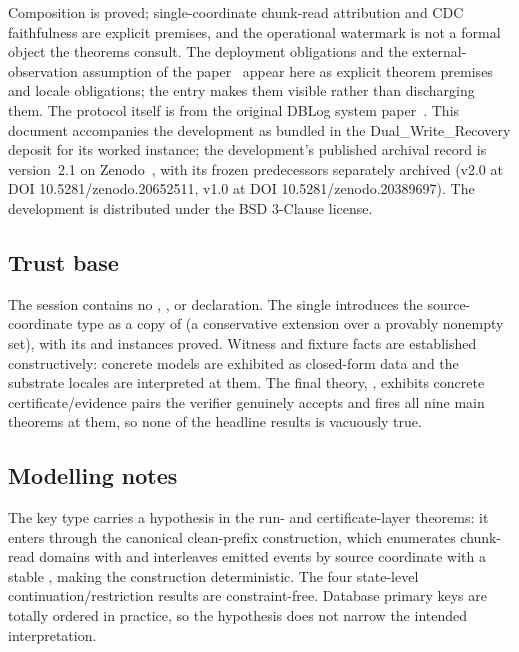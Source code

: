 \documentclass[11pt,a4paper]{article}
\begin{document}
Composition is proved; single-coordinate chunk-read attribution and
CDC faithfulness are explicit premises, and the operational watermark
is not a formal object the theorems consult. The deployment
obligations and the external-observation assumption of the
paper~\cite{andreakis2026theoretical} appear here as explicit theorem
premises and locale obligations; the entry makes them visible rather
than discharging them. The protocol itself is from the original DBLog
system paper~\cite{andreakis2020dblog}. This document accompanies the
development as bundled in the Dual\_Write\_Recovery deposit for its
worked instance; the development's published archival record is
version~2.1 on Zenodo~\cite{andreakis2026artifact}, with its frozen
predecessors separately archived (v2.0 at DOI 10.5281/zenodo.20652511,
v1.0 at DOI 10.5281/zenodo.20389697). The
development is distributed under the BSD 3-Clause license.

\subsection*{Trust base}

The session contains no , , or
 declaration. The single  introduces the
source-coordinate type as a copy of  (a conservative
extension over a provably nonempty set), with its  and
 instances proved. Witness and
fixture facts are established constructively: concrete models are
exhibited as closed-form data and the substrate locales are
interpreted at them. The final theory,
,
exhibits concrete certificate/evidence pairs the verifier genuinely
accepts and fires all nine main theorems at them, so none of the
headline results is vacuously true.

\subsection*{Modelling notes}

The key type  carries a 
hypothesis in the run- and certificate-layer theorems: it enters
through the canonical clean-prefix construction, which enumerates
chunk-read domains with
and interleaves emitted events by source coordinate with a stable
, making the construction
deterministic. The four state-level continuation/restriction results
are constraint-free. Database primary keys are totally ordered in
practice, so the hypothesis does not narrow the intended
interpretation.
\end{document}
